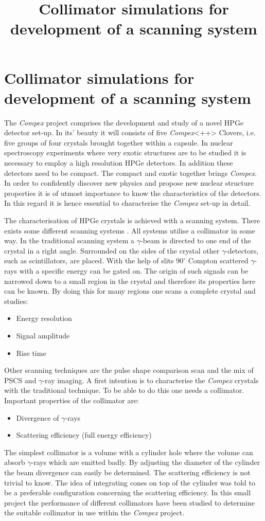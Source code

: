 \documentclass[a4paper]{article}
\title{Collimator simulations for development of a scanning system}
\begin{document}
\section{Collimator simulations for development of a scanning system}

The \textit{Compex} project comprises the development and study of a novel HPGe detector set-up. In its' beauty it will consists of five \textit{Compex}<++> Clovers, i.e. five groups of four crystals brought together within a capsule.
In nuclear spectroscopy experiments where very exotic structures are to be studied it is necessary to employ a high resolution HPGe detectors. In addition these detectors need to be compact. The compact and exotic together brings \textit{Compex}. In order to confidently discover new physics and propose new nuclear structure properties it is of utmost importance to know the characteristics of the detectors. In this regard it is hence essential to characterise the \textit{Compex} set-up in detail.

The characterisation of HPGe crystals is achieved with a scanning system. There exists some different scanning systems \cite{}. All systems utilise a collimator in some way. In the traditional scanning system a $\gamma$-beam is directed to one end of the crystal in a right angle. Surrounded on the sides of the crystal other $\gamma$-detectors, such as scintillators, are placed. With the help of slits $90 ^\circ$ Compton scattered $\gamma$-rays with a specific energy can be gated on. The origin of such signals can be narrowed down to a small region in the crystal and therefore its properties here can be known. By doing this for many regions one scans a complete crystal and studies:
\begin{itemize}
  \item Energy resolution
  \item Signal amplitude
  \item Rise time
\end{itemize}

Other scanning techniques are the pulse shape comparison scan and the mix of PSCS and $\gamma$-ray imaging.
A first intention is to characterise the \textit{Compex} crystals with the traditional technique.
To be able to do this one needs a collimator.
Important properties of the collimator are:
\begin{itemize}
  \item Divergence of $\gamma$-rays
  \item Scattering efficiency (full energy efficiency)
\end{itemize}
The simplest collimator is a volume with a cylinder hole where the volume can absorb $\gamma$-rays which are emitted badly.
By adjusting the diameter of the cylinder the beam divergence can easily be determined.
The scattering efficiency is not trivial to know.
The idea of integrating cones on top of the cylinder was told to be a preferable configuration concerning the scattering efficiency.
In this small project the performance of different collimators have been studied to determine the suitable collimator in use within the \textit{Compex} project.
\end{document}
